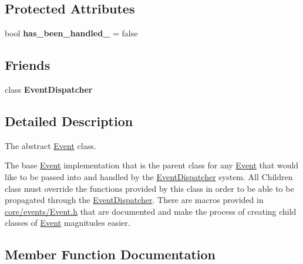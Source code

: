 \subsection*{Protected Attributes}
\begin{DoxyCompactItemize}
\item 
\mbox{\label{classengine_1_1events_1_1Event_ad8e1eb6634225e11963228d6a69c166b}} 
bool {\bfseries has\+\_\+been\+\_\+handled\+\_\+} = false
\end{DoxyCompactItemize}
\subsection*{Friends}
\begin{DoxyCompactItemize}
\item 
\mbox{\label{classengine_1_1events_1_1Event_aad5f38ccd490ea17008460423f52325a}} 
class {\bfseries Event\+Dispatcher}
\end{DoxyCompactItemize}


\subsection{Detailed Description}
The abstract \hyperlink{classengine_1_1events_1_1Event}{Event} class. 

The base \hyperlink{classengine_1_1events_1_1Event}{Event} implementation that is the parent class for any \hyperlink{classengine_1_1events_1_1Event}{Event} that would like to be passed into and handled by the \hyperlink{classengine_1_1events_1_1EventDispatcher}{Event\+Dispatcher} system. All Children class must override the functions provided by this class in order to be able to be propagated through the \hyperlink{classengine_1_1events_1_1EventDispatcher}{Event\+Dispatcher}. There are macros provided in {\ttfamily \hyperlink{Event_8h}{core/events/\+Event.\+h}} that are documented and make the process of creating child classes of \hyperlink{classengine_1_1events_1_1Event}{Event} magnitudes easier. 

\subsection{Member Function Documentation}
\mbox{\label{classengine_1_1events_1_1Event_abf217454944fb4cceb6dee40d886a0c4}} 
